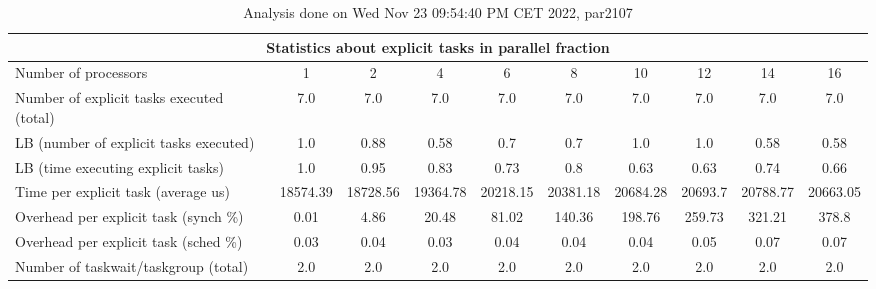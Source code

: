 \begin{table}[h]
\begin{center}
\begin{tabular}{|l|c|c|c|c|c|c|c|c|c|}
\hline
\multicolumn{10}{|c|}{Statistics about explicit tasks in parallel fraction} \\
\hline
\hline
Number of processors & 1 & 2 & 4 & 6 & 8 & 10 & 12 & 14 & 16 \\
\hline
\hline
Number of explicit tasks executed (total)        &             7.0 &             7.0 &             7.0 &             7.0 &             7.0 &             7.0 &             7.0 &             7.0 &             7.0 \\
\hline
LB (number of explicit tasks executed)           &             1.0 &            0.88 &            0.58 &             0.7 &             0.7 &             1.0 &             1.0 &            0.58 &            0.58 \\
\hline
LB (time executing explicit tasks)               &             1.0 &            0.95 &            0.83 &            0.73 &             0.8 &            0.63 &            0.63 &            0.74 &            0.66 \\
\hline
Time per explicit task (average us)                 &        18574.39 &        18728.56 &        19364.78 &        20218.15 &        20381.18 &        20684.28 &         20693.7 &        20788.77 &        20663.05 \\
\hline
Overhead per explicit task (synch \%)             &            0.01 &            4.86 &           20.48 &           81.02 &          140.36 &          198.76 &          259.73 &          321.21 &           378.8 \\
\hline
Overhead per explicit task (sched \%)             &            0.03 &            0.04 &            0.03 &            0.04 &            0.04 &            0.04 &            0.05 &            0.07 &            0.07 \\
\hline
Number of taskwait/taskgroup (total)             &             2.0 &             2.0 &             2.0 &             2.0 &             2.0 &             2.0 &             2.0 &             2.0 &             2.0 \\
\hline
\end{tabular}
\end{center}
\caption{ Analysis done on Wed Nov 23 09:54:40 PM CET 2022, par2107}
\end{table}
